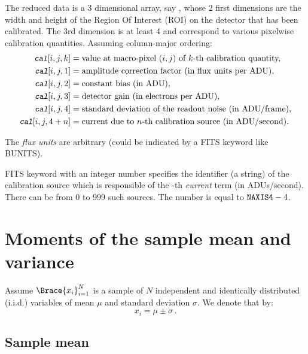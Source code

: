\documentclass[a4paper,11pt,twoside]{scrartcl}
\newcommand{\oops}[1]{\textcolor[named]{BrickRed}{#1}}
\theoremstyle{plain} %
\theoremstyle{definition}
\theoremstyle{remark}
\begin{document}
The reduced data is a 3 dimensional array, say , whose 2
first dimensions are the width and height of the Region Of Interest (ROI)
on the detector that has been calibrated.  The 3rd dimension is at least 4
and correspond to various pixelwise calibration quantities. Assuming
column-major ordering:
\begin{align*}
	\FitsVariable{cal}[i,j,k]
  &= \text{value at macro-pixel $(i,j)$ of $k$-th calibration quantity,} \\
	\FitsVariable{cal}[i,j,1]
  &= \text{amplitude correction factor (in flux units per ADU),} \\
	\FitsVariable{cal}[i,j,2]
  &= \text{constant bias (in ADU),} \\
	\FitsVariable{cal}[i,j,3]
  &= \text{detector gain (in electrons per ADU),} \\
	\FitsVariable{cal}[i,j,4]
  &= \text{standard deviation of the readout noise (in ADU/frame),} \\
	\FitsVariable{cal}[i,j,4+n]
  &= \text{current due to $n$-th calibration source (in ADU/second).}
\end{align*}

The \emph{flux units} are arbitrary \oops{(could be indicated by a FITS keyword like BUNITS)}.

FITS keyword  with  an
integer number specifies the identifier (a string) of the calibration source
which is responsible of the -th \emph{current} term (in
ADUs/second).  There can be from 0 to 999 such sources.  The number is equal
to $\text{\ttfamily NAXIS4} - 4$.

\section{Moments of the sample mean and variance}
\label{sec:sample-statistics}

Assume $\Brace{x_i}_{i=1}^N$ is a sample of $N$ independent and identically
distributed (i.i.d.) variables of mean $\mu$ and standard deviation
$\sigma$.  We denote that by:
\begin{equation}
  x_i = \mu \pm \sigma \, .
  \label{eq:random-notation}
\end{equation}


\subsection{Sample mean}
\label{sec:sample-mean}
\end{document}
